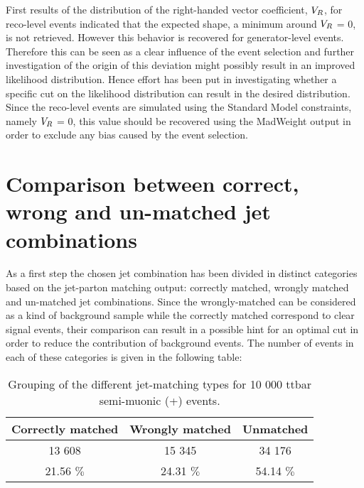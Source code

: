 First results of the \NegLL distribution of the right-handed vector coefficient, $V_{R}$, for reco-level events indicated that the expected shape, a minimum around $V_{R}$ = 0, is not retrieved. However this behavior is recovered for generator-level events. Therefore this can be seen as a clear influence of the event selection and further investigation of the origin of this deviation might possibly result in an improved likelihood distribution. Hence effort has been put in investigating whether a specific cut on the likelihood distribution can result in the desired distribution.\\
Since the reco-level events are simulated using the Standard Model constraints, namely $V_{R}$ = 0, this value should be recovered using the MadWeight output in order to exclude any bias caused by the event selection.

\section{Comparison between correct, wrong and un-matched jet combinations}
As a first step the chosen \ttbar jet combination has been divided in distinct categories based on the jet-parton matching output: correctly matched, wrongly matched and un-matched jet combinations. Since the wrongly-matched can be considered as a kind of background sample while the correctly matched correspond to clear signal events, their comparison can result in a possible hint for an optimal cut in order to reduce the contribution of background events. The number of events in each of these categories is given in the following table:
\begin{table}[!h]
 \centering
 \caption{Grouping of the different jet-matching types for 10 000 ttbar semi-muonic (+) events.}
 \begin{tabular}{c|c|c}
  Correctly matched 	& Wrongly matched  	& Unmatched  	\\
  \hline
  13 608 		& 15 345 		& 34 176    	\\
  21.56 $\%$ 		& 24.31 $\%$		& 54.14 $\%$
 \end{tabular}
\end{table}

